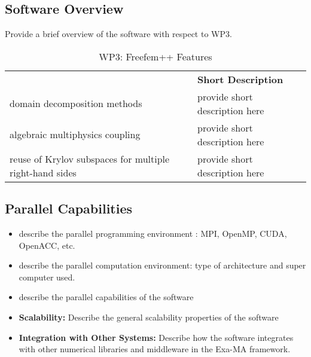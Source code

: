 \subsection{Software Overview}
\label{sec:WP3:Freefem++:summary}

Provide a brief overview of the software with respect to WP3.

\begin{table}[h!]
    \centering
    { 
        \setlength{\parindent}{0pt}
        \def\arraystretch{1.25}
        {
            \fontsize{9}{11}\selectfont
            \begin{tabular}{!{\color{numpexgray}\vrule}p{.25\linewidth}!{\color{numpexgray}\vrule}p{.6885\linewidth}!{\color{numpexgray}\vrule}}
    
     &  {\rule{0pt}{2.5ex}\color{white}\bf Short Description }\\ 
    
    domain decomposition methods & provide short description here \\
    algebraic multiphysics coupling & provide short description here \\
    reuse of Krylov subspaces for multiple right-hand sides & provide short description here \\
\end{tabular}
        }
    }
    \caption{WP3: Freefem++ Features}
\end{table}


\subsection{Parallel Capabilities}
\label{sec:WP3:Freefem++:performances}


\begin{itemize}
    \item describe the parallel programming  environment : MPI, OpenMP, CUDA, OpenACC, etc.
    \item describe the parallel computation environment: type of architecture and super computer used.
    \item describe the parallel capabilities of the software
    \item \textbf{Scalability:} Describe the general scalability properties of the software
    \item \textbf{Integration with Other Systems:} Describe how the software integrates with other numerical libraries and middleware in the Exa-MA framework.
\end{itemize}

